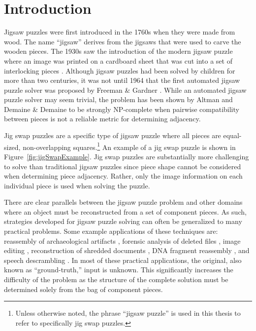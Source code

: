 \chapter{Introduction}\label{sec:introduction}

Jigsaw puzzles were first introduced in the 1760s when they were made from wood.  The name ``jigsaw'' derives from the jigsaws that were used to carve the wooden pieces.   The 1930s saw the introduction of the modern jigsaw puzzle where an image was printed on a cardboard sheet that was cut into a set of interlocking pieces \cite{williams1990, williams2004}.  Although jigsaw puzzles had been solved by children for more than two centuries, it was not until 1964 that the first automated jigsaw puzzle solver was proposed by Freeman \& Gardner \cite{freeman1964}.  While an automated jigsaw puzzle solver may seem trivial, the problem has been shown by Altman \cite{altman1990} and Demaine \& Demaine \cite{demaine2007} to be strongly NP-complete when pairwise compatibility between pieces is not a reliable metric for determining adjacency.

Jig swap puzzles are a specific type of jigsaw puzzle where all pieces are equal-sized, non-overlapping squares.\footnote{Unless otherwise noted, the phrase ``jigsaw puzzle'' is used in this thesis to refer to specifically jig swap puzzles.}  An example of a jig swap puzzle is shown in Figure~\ref{fig:jigSwapExample}.  Jig swap puzzles are substantially more challenging to solve than traditional jigsaw puzzles since piece shape cannot be considered when determining piece adjacency.  Rather, only the image information on each individual piece is used when solving the puzzle.

There are clear parallels between the jigsaw puzzle problem and other domains where an object must be reconstructed from a set of component pieces.  As such, strategies developed for jigsaw puzzle solving can often be generalized to many practical problems.  Some example applications of these techniques are: reassembly of archaeological artifacts \cite{brown2008, koller2006}, forensic analysis of deleted files \cite{garfinkel2010}, image editing \cite{cho2008}, reconstruction of shredded documents \cite{zhu2008}, DNA fragment reassembly \cite{marande2007}, and speech descrambling \cite{zhao2007}.  In most of these practical applications, the original, also known as ``ground-truth,'' input is unknown.  This significantly increases the difficulty of the problem as the structure of the complete solution must be determined solely from the bag of component pieces.

